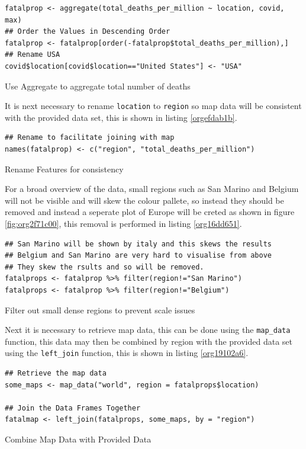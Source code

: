 \documentclass[11pt]{article}
\begin{document}
\begin{listing}[htbp]
\begin{verbatim}
fatalprop <- aggregate(total_deaths_per_million ~ location, covid, max)
## Order the Values in Descending Order
fatalprop <- fatalprop[order(-fatalprop$total_deaths_per_million),]
## Rename USA
covid$location[covid$location=="United States"] <- "USA"
\end{verbatim}
\caption{\label{org347d4df}Use Aggregate to aggregate total number of deaths}
\end{listing}


It is next necessary to rename \texttt{location} to \texttt{region} so map data will be
consistent with the provided data set, this is shown in listing \ref{orgefdab1b}.

\begin{listing}[htbp]
\begin{verbatim}
## Rename to facilitate joining with map
names(fatalprop) <- c("region", "total_deaths_per_million")
\end{verbatim}
\caption{\label{orgefdab1b}Rename Features for consistency}
\end{listing}

For a broad overview of the data, small regions such as San Marino and Belgium
will not be visible and will skew the colour pallete, so instead they should be removed
and instead a seperate plot of Europe will be creted as shown in figure \ref{fig:org2f71c00}, this removal is performed in
listing \ref{org16dd651}.

\begin{listing}[htbp]
\begin{verbatim}
## San Marino will be shown by italy and this skews the results
## Belgium and San Marino are very hard to visualise from above
## They skew the rsults and so will be removed.
fatalprops <- fatalprop %>% filter(region!="San Marino")
fatalprops <- fatalprop %>% filter(region!="Belgium")
\end{verbatim}
\caption{\label{org16dd651}Filter out small dense regions to prevent scale issues}
\end{listing}


Next it is necessary to retrieve map data, this can be done using the \texttt{map\_data}
function, this data may then be combined by region with the provided data set
using the \texttt{left\_join} function, this is shown in listing \ref{org19102a6}.

\begin{listing}[htbp]
\begin{verbatim}
## Retrieve the map data
some_maps <- map_data("world", region = fatalprops$location)

## Join the Data Frames Together
fatalmap <- left_join(fatalprops, some_maps, by = "region")
\end{verbatim}
\caption{\label{org19102a6}Combine Map Data with Provided Data}
\end{listing}
\end{document}
